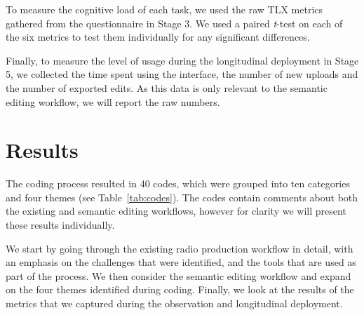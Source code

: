 To measure the cognitive load of each task, we used the raw TLX metrics gathered from the questionnaire in Stage 3. We
used a paired \textit{t}-test on each of the six metrics to test them individually for any significant differences.

Finally, to measure the level of usage during the longitudinal deployment in Stage 5, we collected the time spent using the
interface, the number of new uploads and the number of exported edits. As this data is only relevant to the semantic
editing workflow, we will report the raw numbers.

\section{Results}\label{sec:screen-results}

The coding process resulted in 40 codes, which were grouped into ten categories and four themes (see
Table~\ref{tab:codes}). The codes contain comments about both the existing and semantic editing workflows, however for
clarity we will present these results individually.

We start by going through the existing radio production workflow in detail, with an emphasis on the challenges that
were identified, and the tools that are used as part of the process. We then consider the semantic editing workflow and
expand on the four themes identified during coding. Finally, we look at the results of the metrics that we captured
during the observation and longitudinal deployment.


